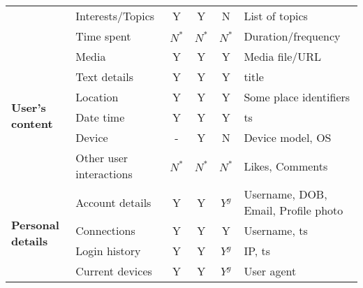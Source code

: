 \begin{table*}[!h]
\begin{tabular}{@{}llcccl@{}}
                                         & Interests/Topics                  & Y               & Y                  & N                & List of topics                                       \\
                                         & Time spent                        & $N^*$           & $N^*$              & $N^*$            & Duration/frequency                                   \\ \midrule
\multirow{6}{*}{\textbf{User's content}}   & Media                             & Y               & Y                  & Y                & Media file/URL                                      \\
                                         & Text details                      & Y               & Y                  & Y                & title                                                \\
                                         & Location                          & Y               & Y                  & Y                & Some place identifiers                               \\
                                         & Date time                         & Y               & Y                  & Y                & ts                                                   \\
                                         & Device                            & -               & Y                  & N                & Device model, OS                                     \\
                                         & Other user interactions           & $N^*$           & $N^*$              & $N^*$            & Likes, Comments                                      \\ \midrule
\multirow{7}{*}{\textbf{Personal details}}       & Account details                   & Y               & Y                  & $Y^g$            & Username, DOB, Email, Profile photo                  \\
                                         & Connections                       & Y               & Y                  & Y               & Username, ts                                         \\
                                         & Login history                     & Y               & Y                  & $Y^g$            & IP, ts                                               \\
                                         & Current devices                   & Y               & Y                  & $Y^g$            & User agent                                           \\

\end{tabular}
\end{table*}
